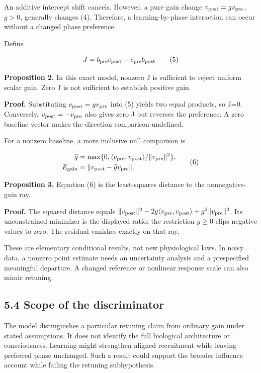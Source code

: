 \documentclass[
  american,
  11pt,
  letterpaper,
]{article}
\begin{document}
An additive intercept shift cancels. However, a pure gain change \(v_{\rm post}=g v_{\rm pre}\), \(g>0\), generally changes (4). Therefore, a learning-by-phase interaction can occur without a changed phase preference.

Define

\begin{equation}
J=b_{\rm pre}c_{\rm post}-c_{\rm pre}b_{\rm post}\tag{5}
\end{equation}

\textbf{Proposition 2.} In this exact model, nonzero J is sufficient to reject uniform scalar gain. Zero J is not sufficient to establish positive gain.

\textbf{Proof.} Substituting \(v_{\rm post}=g v_{\rm pre}\) into (5) yields two equal products, so J=0. Conversely, \(v_{\rm post}=-v_{\rm pre}\) also gives zero J but reverses the preference. A zero baseline vector makes the direction comparison undefined.

For a nonzero baseline, a more inclusive null comparison is

\begin{equation}
\begin{aligned}\widehat g&=\max\{0,\langle v_{\rm pre},v_{\rm post}\rangle/\|v_{\rm pre}\|^2\},\\ E_{\rm gain}&=\|v_{\rm post}-\widehat g v_{\rm pre}\|.\end{aligned}\tag{6}
\end{equation}

\textbf{Proposition 3.} Equation (6) is the least-squares distance to the nonnegative-gain ray.

\textbf{Proof.} The squared distance equals \(\|v_{\rm post}\|^2-2g\langle v_{\rm pre},v_{\rm post}\rangle+g^2\|v_{\rm pre}\|^2\). Its unconstrained minimizer is the displayed ratio; the restriction \(g\geq0\) clips negative values to zero. The residual vanishes exactly on that ray.

These are elementary conditional results, not new physiological laws. In noisy data, a nonzero point estimate needs an uncertainty analysis and a prespecified meaningful departure. A changed reference or nonlinear response scale can also mimic retuning.

\subsection{5.4 Scope of the discriminator}\label{scope-of-the-discriminator}

The model distinguishes a particular retuning claim from ordinary gain under stated assumptions. It does not identify the full biological architecture or consciousness. Learning might strengthen aligned recruitment while leaving preferred phase unchanged. Such a result could support the broader influence account while failing the retuning subhypothesis.
\end{document}
